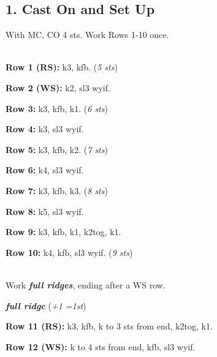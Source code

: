 \documentclass[12pt]{article}
\newcommand{\vocab}[1]{\emph{\textbf{#1}}} %
\newcommand{\rowDir}[1]{\textbf{#1:}} %
\newcommand{\highlighted}[1]{\fbox{#1}} %
\newcommand{\increase}[1]{(\emph{+#1 
	\ifnum#1=1{st}\else{sts}\fi})}
\newcommand{\stitchcount}[1]{(\emph{#1 sts})}
\begin{document}
\newpage
\begin{multicols}{2} \normalsize
\section*{1. Cast On and Set Up}

With MC, CO 4 sts. Work Rows 1-10 once.

~\\
\rowDir{Row 1 (RS)} k3, kfb. \stitchcount{5}

\rowDir{Row 2 (WS)} k2, sl3 wyif.

\rowDir{Row 3} k3, kfb, k1. \stitchcount{6}

\rowDir{Row 4} k3, sl3 wyif.

\rowDir{Row 5} k3, kfb, k2. \stitchcount{7}

\rowDir{Row 6} k4, sl3 wyif.

\rowDir{Row 7} k3, kfb, k3. \stitchcount{8}

\rowDir{Row 8} k5, sl3 wyif.

\rowDir{Row 9} k3, kfb, k1, k2tog, k1.

\rowDir{Row 10} k4, kfb, sl3 wyif. \stitchcount{9}

~\\
Work \highlighted{28} \vocab{full ridges}, ending after a WS row.

\begin{framed}
\vocab{full ridge} \increase{1} \vspace{0.5em}

\rowDir{Row 11 (RS)} k3, kfb, k to 3 sts from end, k2tog, k1.

\rowDir{Row 12 (WS)} k to 4 sts from end, kfb, sl3 wyif.
\end{framed}
\columnbreak


\end{multicols}
\end{document}
